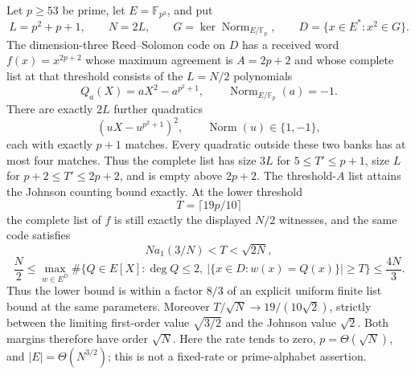 \begin{theorem}\label{thm:norm-one-direct-list}
Let $p\ge53$ be prime, let $E=\mathbb F_{p^3}$, and put
\[
 L=p^2+p+1,\qquad N=2L,\qquad
 G=\ker\operatorname{Norm}_{E/\mathbb F_p},\qquad
 D=\{x\in E^*:x^2\in G\}.
\]
The dimension-three Reed--Solomon code on $D$ has a received word
$f(x)=x^{2p+2}$ whose maximum agreement is $A=2p+2$ and whose complete
list at that threshold consists of the $L=N/2$ polynomials
\[
 Q_a(X)=aX^2-a^{p^2+1},\qquad
 \operatorname{Norm}_{E/\mathbb F_p}(a)=-1.
\]
There are exactly $2L$ further quadratics
\[
 (uX-u^{p^2+1})^2,\qquad \operatorname{Norm}(u)\in\{1,-1\},
\]
each with exactly $p+1$ matches. Every quadratic outside these two
banks has at most four matches. Thus the complete list has size $3L$
for $5\le T'\le p+1$, size $L$ for $p+2\le T'\le2p+2$, and is
empty above $2p+2$.
The threshold-$A$ list attains the Johnson counting bound exactly.
At the lower threshold
\[
 T=\lceil19p/10\rceil
\]
the complete list of $f$ is still exactly the displayed $N/2$ witnesses,
and the same code satisfies
\[
 N a_1(3/N)<T<\sqrt{2N},
\]
\[
 \frac N2\le\max_{w\in E^D}
 \#\{Q\in E[X]:\deg Q\le2,\ |\{x\in D:w(x)=Q(x)\}|\ge T\}
 \le\frac{4N}{3}.
\]
Thus the lower bound is within a factor $8/3$ of an explicit uniform
finite list bound at the same parameters. Moreover
$T/\sqrt N\to19/(10\sqrt2)$, strictly between the limiting
first-order value $\sqrt{3/2}$ and the Johnson value $\sqrt2$.
Both margins therefore have order $\sqrt N$. Here the rate tends
to zero, $p=\Theta(\sqrt N)$, and $|E|=\Theta(N^{3/2})$; this is not a
fixed-rate or prime-alphabet assertion.
\end{theorem}

